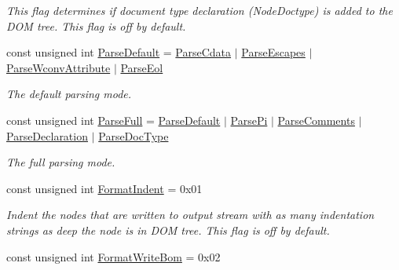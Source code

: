 \begin{DoxyCompactItemize}
\begin{DoxyCompactList}\small\item\em This flag determines if document type declaration (NodeDoctype) is added to the DOM tree. This flag is off by default. \item\end{DoxyCompactList}\item 
const unsigned int \hyperlink{namespacephys_1_1xml_aa6b8f7f8c2322fd683a235b498834d60}{ParseDefault} = \hyperlink{namespacephys_1_1xml_aec00a2a16700dfd76f8f3c776bd000ac}{ParseCdata} $|$ \hyperlink{namespacephys_1_1xml_a6463412ba9e404b6890e4721255cd8ed}{ParseEscapes} $|$ \hyperlink{namespacephys_1_1xml_af9f7575e3cb8a0d8ad9a7ceee5e26983}{ParseWconvAttribute} $|$ \hyperlink{namespacephys_1_1xml_a52af747730d2b3a313eebed4cf49a333}{ParseEol}
\begin{DoxyCompactList}\small\item\em The default parsing mode. \item\end{DoxyCompactList}\item 
const unsigned int \hyperlink{namespacephys_1_1xml_af1c356f1eb063a63efebd6c8a5241c63}{ParseFull} = \hyperlink{namespacephys_1_1xml_aa6b8f7f8c2322fd683a235b498834d60}{ParseDefault} $|$ \hyperlink{namespacephys_1_1xml_a4d324954fc33d50155bae04587da13e2}{ParsePi} $|$ \hyperlink{namespacephys_1_1xml_a83ba30a7bee5a0fd4aa2f6136c8793fc}{ParseComments} $|$ \hyperlink{namespacephys_1_1xml_a463f15fc43d69ab835c8598826f65646}{ParseDeclaration} $|$ \hyperlink{namespacephys_1_1xml_adf5ee79dc4c200ad85b64a8308b0c805}{ParseDocType}
\begin{DoxyCompactList}\small\item\em The full parsing mode. \item\end{DoxyCompactList}\item 
\hypertarget{namespacephys_1_1xml_afaad0b8f59b5f103218ed5cb39b1bbde}{
const unsigned int \hyperlink{namespacephys_1_1xml_afaad0b8f59b5f103218ed5cb39b1bbde}{FormatIndent} = 0x01}
\label{d9/d27/namespacephys_1_1xml_afaad0b8f59b5f103218ed5cb39b1bbde}

\begin{DoxyCompactList}\small\item\em Indent the nodes that are written to output stream with as many indentation strings as deep the node is in DOM tree. This flag is off by default. \item\end{DoxyCompactList}\item 
\hypertarget{namespacephys_1_1xml_a76a253f60deb94ef39c255064afb6040}{
const unsigned int \hyperlink{namespacephys_1_1xml_a76a253f60deb94ef39c255064afb6040}{FormatWriteBom} = 0x02}
\label{d9/d27/namespacephys_1_1xml_a76a253f60deb94ef39c255064afb6040}


\end{DoxyCompactItemize}
